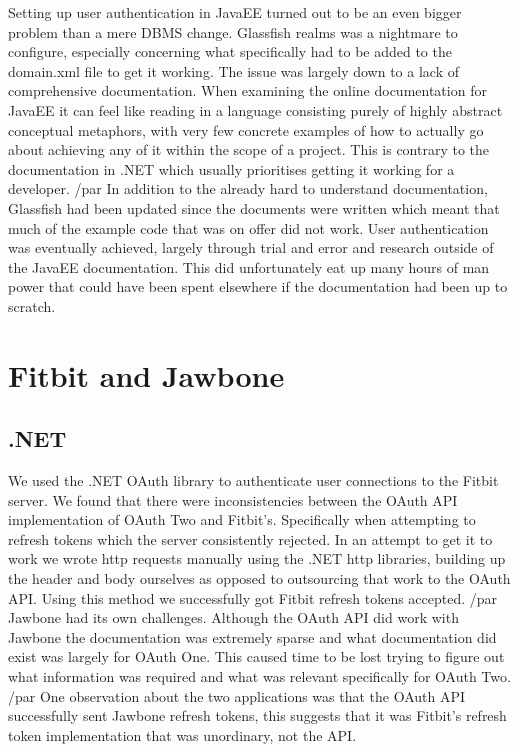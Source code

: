 Setting up user authentication in JavaEE turned out to be an even bigger problem than a mere DBMS change. Glassfish realms was a nightmare to configure, especially concerning what specifically had to be added to the domain.xml file to get it working. The issue was largely down to a lack of comprehensive documentation. When examining the online documentation for JavaEE it can feel like reading in a language consisting purely of highly abstract conceptual metaphors, with very few concrete examples of how to actually go about achieving any of it within the scope of a project. This is contrary to the documentation in .NET which usually prioritises getting it working for a developer. /par
In addition to the already hard to understand documentation, Glassfish had been updated since the documents were written which meant that much of the example code that was on offer did not work. User authentication was eventually achieved, largely through trial and error and research outside of the JavaEE documentation. This did unfortunately eat up many hours of man power that could have been spent elsewhere if the documentation had been up to scratch.
\section{Fitbit and Jawbone}
\subsection{.NET}
We used the .NET OAuth library to authenticate user connections to the Fitbit server. We found that there were inconsistencies between the OAuth API implementation of OAuth Two and Fitbit’s. Specifically when attempting to refresh tokens which the server consistently rejected. In an attempt to get it to work we wrote http requests manually using the .NET http libraries, building up the header and body ourselves as opposed to outsourcing that work to the OAuth API. Using this method we successfully got Fitbit refresh tokens accepted. /par
Jawbone had its own challenges. Although the OAuth API did work with Jawbone the documentation was extremely sparse and what documentation did exist was largely for OAuth One. This caused time to be lost trying to figure out what information was required and what was relevant specifically for OAuth Two. /par
One observation about the two applications was that the OAuth API successfully sent Jawbone refresh tokens, this suggests that it was Fitbit’s refresh token implementation that was unordinary, not the API.
